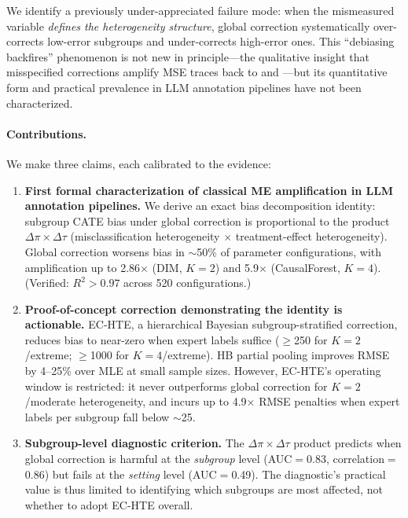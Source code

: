 \documentclass[11pt,twocolumn]{article}
\begin{document}
We identify a previously under-appreciated failure mode: when the mismeasured variable \emph{defines the heterogeneity structure}, global correction systematically over-corrects low-error subgroups and under-corrects high-error ones. This ``debiasing backfires'' phenomenon is not new in principle---the qualitative insight that misspecified corrections amplify MSE traces back to \citet{fuller1987measurement} and \citet{carroll2006measurement}---but its quantitative form and practical prevalence in LLM annotation pipelines have not been characterized.

\paragraph{Contributions.} We make three claims, each calibrated to the evidence:

\begin{enumerate}
\item \textbf{First formal characterization of classical ME amplification in LLM annotation pipelines.} We derive an exact bias decomposition identity: subgroup CATE bias under global correction is proportional to the product $\Delta\pi \times \Delta\tau$ (misclassification heterogeneity $\times$ treatment-effect heterogeneity). Global correction worsens bias in $\sim$50\% of parameter configurations, with amplification up to 2.86$\times$ (DIM, $K{=}2$) and 5.9$\times$ (CausalForest, $K{=}4$). (Verified: $R^2 > 0.97$ across 520 configurations.)

\item \textbf{Proof-of-concept correction demonstrating the identity is actionable.} EC-HTE, a hierarchical Bayesian subgroup-stratified correction, reduces bias to near-zero when expert labels suffice ($\geq$250 for $K{=}2$/extreme; $\geq$1000 for $K{=}4$/extreme). HB partial pooling improves RMSE by 4--25\% over MLE at small sample sizes. However, EC-HTE's operating window is restricted: it never outperforms global correction for $K{=}2$/moderate heterogeneity, and incurs up to 4.9$\times$ RMSE penalties when expert labels per subgroup fall below $\sim$25.

\item \textbf{Subgroup-level diagnostic criterion.} The $\Delta\pi \times \Delta\tau$ product predicts when global correction is harmful at the \emph{subgroup} level (AUC$=$0.83, correlation$=$0.86) but fails at the \emph{setting} level (AUC$=$0.49). The diagnostic's practical value is thus limited to identifying which subgroups are most affected, not whether to adopt EC-HTE overall.
\end{enumerate}
\end{document}
